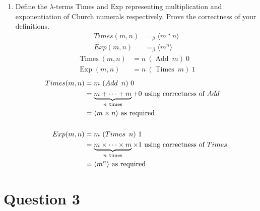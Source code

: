 \documentclass[10pt,\jkfside,a4paper]{article}
\begin{document}
\begin{enumerate}[label=(\alph*)]
\begin{itemize}
\end{itemize}

\item Define the $\lambda$-terms Times and Exp representing multiplication
and exponentiation of Church numerals respectively. Prove the correctness
of your definitions.
\begin{align*}
\mathit{Times}(m, n) &=_\beta \langle m * n \rangle \\
\mathit{Exp}(m, n) &=_\beta \langle m^n \rangle
\end{align*}
\begin{align*}
\mathop{Times}(m, n) &= n\ (\mathop{Add}\ m)\ 0 \\
\mathop{Exp}(m, n) &= n\ (\mathop{Times}\ m)\ 1
\end{align*}
\begin{align*}
\mathop{Times}(m, n) &= m\ (\mathop{Add}\ n)\ 0 \\
&= \underbrace{m + \dots + m}_{n\ \text{times}} + 0 \text{\ using correctness
 of $\mathop{Add}$} \\
&= \langle m \times n \rangle \text{\ as required}\\\\
\mathop{Exp}(m, n) &= m\ (\mathop{Times}\ n)\ 1 \\
&= \underbrace{m \times \dots \times m}_{n\ \text{times}} \times 1 \text{\
using correctness of $\mathop{Times}$} \\
&= \langle m^n \rangle \text{\ as required}
\end{align*}

\end{enumerate}

\section{Question 3}
\end{document}
